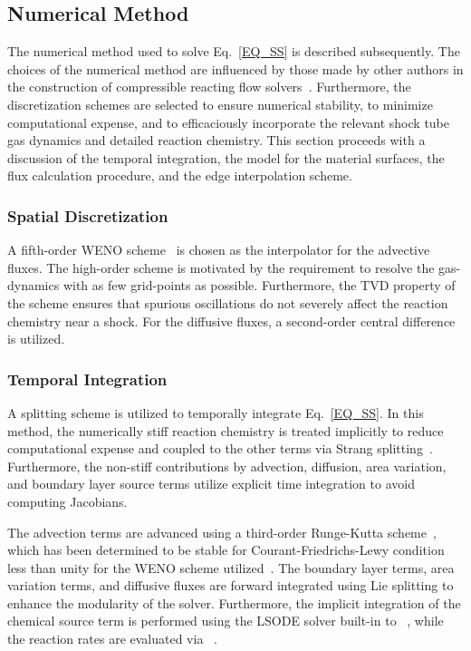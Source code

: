 \subsection{Numerical Method}
The numerical method used to solve Eq.~\ref{EQ_SS} is described subsequently. The choices of the numerical method are influenced by those made by other authors in the construction of  compressible reacting flow solvers~\cite{HOUIM_KUO_JCP_2011,ZIEGLER_THESIS11,LV_JCP2014}. Furthermore, the discretization schemes are selected to ensure numerical stability, to minimize computational expense, and to efficaciously incorporate the relevant shock tube gas dynamics and detailed reaction chemistry. This section proceeds with a discussion of the temporal integration, the model for the material surfaces, the flux calculation procedure, and the edge interpolation scheme.

\subsubsection{Spatial Discretization}
A fifth-order WENO scheme~\cite{SHU_REPORT1997, GROGAN_THESIS18} is chosen as the interpolator for the advective fluxes. The high-order scheme is motivated by the requirement to resolve the gas-dynamics with as few grid-points as possible. Furthermore, the TVD property of the scheme ensures that spurious oscillations do not severely affect the reaction chemistry near a shock. For the diffusive fluxes, a second-order central difference is utilized.

\subsubsection{Temporal Integration}
A splitting scheme is utilized to temporally integrate Eq.~\ref{EQ_SS}. In this method, the numerically stiff reaction chemistry is treated implicitly to reduce computational expense and coupled to the other terms via Strang splitting~\cite{GLOWINSKI_BOOK}. Furthermore, the non-stiff contributions by advection, diffusion, area variation, and boundary layer source terms utilize explicit time integration to avoid computing Jacobians. 

The advection terms are advanced using a third-order Runge-Kutta scheme~\cite{GROGAN_THESIS18}, which has been determined to be stable for Courant-Friedrichs-Lewy condition less than unity for the WENO scheme utilized~\cite{SHU_REPORT1997}. The boundary layer terms, area variation terms, and diffusive fluxes are forward integrated using Lie splitting to enhance the modularity of the solver. Furthermore, the implicit integration of the chemical source term is performed using the LSODE solver built-in to {}~\cite{SciPy}, while the reaction rates are evaluated via \cantera~\cite{Cantera}. 
